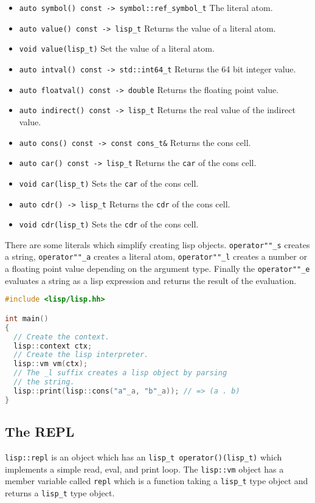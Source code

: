 \documentclass[a4paper]{article}
\newcommand{\lisp}[1]{\texttt{#1}}
\newcommand{\cpp}[1]{\texttt{#1}}
\begin{document}
\begin{itemize}
  \item \cpp{auto symbol() const -> symbol::ref\_symbol\_t} The literal atom.
  \item \cpp{auto value() const -> lisp\_t} Returns the value of a literal
    atom.
  \item \cpp{void value(lisp\_t)} Set the value of a literal atom.
  \item \cpp{auto intval() const -> std::int64\_t} Returns the 64 bit
    integer value.
  \item \cpp{auto floatval() const -> double} Returns the floating
    point value.
  \item \cpp{auto indirect() const -> lisp\_t} Returns the real
    value of the indirect value.
  \item \cpp{auto cons() const -> const cons\_t\&} Returns the cons
    cell.
  \item \cpp{auto car() const -> lisp\_t} Returns the \lisp{car} of
    the cons cell.
  \item \cpp{void car(lisp\_t)} Sets the \lisp{car} of the cons cell.
  \item \cpp{auto cdr() -> lisp\_t} Returns the \lisp{cdr} of
    the cons cell.
  \item \cpp{void cdr(lisp\_t)} Sets the \lisp{cdr} of the cons cell.
\end{itemize}

There are some literals which simplify creating lisp
objects. \cpp{operator""\_s} creates a string, \cpp{operator""\_a}
creates a literal atom, \cpp{operator""\_l} creates a number or a
floating point value depending on the argument type. Finally the
\cpp{operator""\_e} evaluates a string as a lisp expression and returns
the result of the evaluation.

\begin{lstlisting}[language=c++]
#include <lisp/lisp.hh>

int main()
{
  // Create the context.
  lisp::context ctx;
  // Create the lisp interpreter.
  lisp::vm vm(ctx);
  // The _l suffix creates a lisp object by parsing
  // the string.
  lisp::print(lisp::cons("a"_a, "b"_a)); // => (a . b)
}
\end{lstlisting}
\subsection{The REPL}
\cpp{lisp::repl} is an object which has an \cpp{lisp\_t
  operator()(lisp\_t)} which implements a simple read, eval, and print
loop.  The \cpp{lisp::vm} object has a member variable called
\cpp{repl} which is a function taking a \cpp{lisp\_t} type object and
returns a \cpp{lisp\_t} type object.
\end{document}
